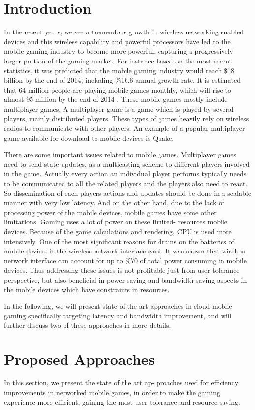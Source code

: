 \documentclass[conference]{IEEEtran}
\begin{document}
\section{Introduction}
In the recent years, we see a tremendous growth in wireless networking enabled devices and this wireless capability and powerful processors have led to the mobile gaming industry  to  become  more  powerful,  capturing a progressively larger portion of  the  gaming  market. For instance based on the most recent statistics, it was predicted that the mobile gaming industry would reach \$18 billion by the end of 2014, including \%16.6 annual growth rate. It is estimated that 64 million people are playing mobile games monthly, which will rise to almost 95 million by the end of 2014 \cite{r23}. These mobile games mostly include multiplayer games. A multiplayer game is a game which is played by several players, mainly distributed players. These types of games heavily rely on wireless radios to communicate with other players. An example of a popular multiplayer game available for download to mobile devices is Quake.

There are some important issues related to mobile games. Multiplayer games need to send state updates, as a multicasting scheme to different players involved in the game. Actually every action an individual player performs typically needs to be communicated to all the related players and the players also need to react. So dissemination of each players actions and updates should be done in a scalable manner with very low latency. And on the other hand, due to the lack of processing power of the mobile devices, mobile games have some other limitations. Gaming uses a lot of power on these limited- resources mobile devices. Because of the game calculations and rendering, CPU is used more intensively. One of the most significant reasons for drains on the batteries of mobile devices is the wireless network interface card. It was shown that wireless network interface can account for up to \%70 of total power consuming in mobile devices. Thus addressing these issues is not profitable just from user tolerance perspective, but also beneficial in power saving and bandwidth saving aspects in the mobile devices which have constraints in resources.

In the following, we will present state-of-the-art approaches in cloud mobile gaming specifically targeting latency and bandwidth improvement, and will further discuss two of these approaches in more details.

\section{Proposed Approaches}
In this section, we present the state of the art ap- proaches used for efficiency improvements in networked mobile games, in order to make the gaming experience more efficient, gaining the most user tolerance and resource saving.
\end{document}
